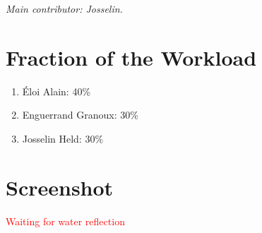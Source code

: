 \documentclass[12pt]{article}
\begin{document}
{\it Main contributor: Josselin.}




\section{Fraction of the Workload}


\begin{enumerate}
\item Éloi Alain: 40\%
\item Enguerrand Granoux: 30\%
\item Josselin Held: 30\%
\end{enumerate}

\section{Screenshot}

\textcolor{red}{Waiting for water reflection}

\end{document}
